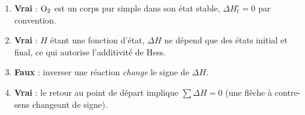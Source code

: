 \documentclass[11pt,a4paper]{article}
\begin{document}
\begin{corrige}
\begin{enumerate}[label=\alph*)]
  \item \textbf{Vrai} : $\ce{O2}$ est un corps pur simple dans son état stable, $\Delta H^\circ_{\text{f}}=0$ par convention.
  \item \textbf{Vrai} : $H$ étant une fonction d'état, $\Delta H$ ne dépend que des états initial et final, ce qui autorise l'additivité de Hess.
  \item \textbf{Faux} : inverser une réaction \emph{change} le signe de $\Delta H$.
  \item \textbf{Vrai} : le retour au point de départ implique $\sum \Delta H = 0$ (une flèche à contre-sens changeant de signe).
\end{enumerate}
\end{corrige}
\end{document}
